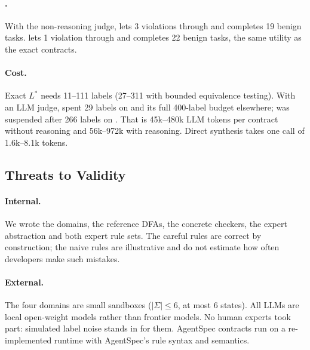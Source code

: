 \paragraph{\system{}.}
With the non-reasoning judge, \system{} lets 3 violations through and completes 19 benign tasks. \systemR{} lets 1
violation through and completes 22 benign tasks, the same utility as the exact contracts.

\paragraph{Cost.}
Exact $L^*$ needs 11--111 labels (27--311 with bounded equivalence testing). With an LLM judge, \system{} spent 29
labels on  and its full 400-label budget elsewhere; \systemR{} was suspended after 266 labels on
. That is 45k--480k LLM tokens per contract without
reasoning and 56k--972k with reasoning. Direct synthesis takes one call of 1.6k--8.1k tokens.



\subsection{Threats to Validity}
\label{sec:threats}

\paragraph{Internal.}
We wrote the domains, the reference DFAs, the concrete checkers, the expert abstraction and both expert rule sets. The
careful rules are correct by construction; the naive rules are illustrative and do not estimate how often developers
make such mistakes.

\paragraph{External.}
The four domains are small sandboxes ($|\Sigma|\le 6$, at most 6 states). All LLMs are local open-weight models rather
than frontier models. No human experts took part: simulated label noise stands in for them. AgentSpec contracts run on a
re-implemented runtime with AgentSpec's rule syntax and semantics.

